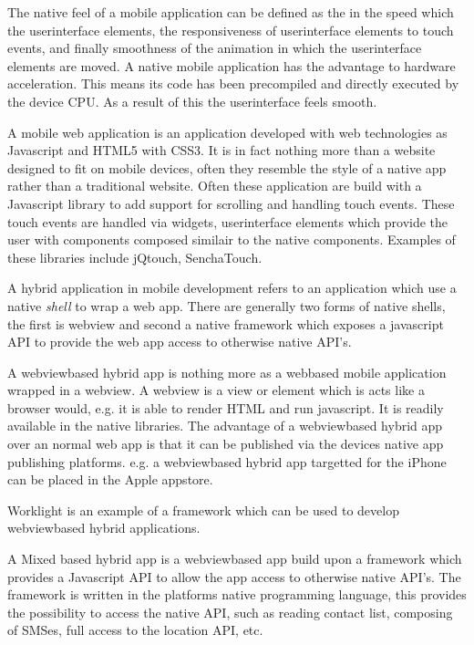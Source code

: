
The native feel of a mobile application can be defined as the in the speed which the userinterface elements, the responsiveness of userinterface elements to touch events, and finally smoothness of the animation in which the userinterface elements are moved.
A native mobile application has the advantage to hardware acceleration. This means its code has been precompiled and directly executed by the device CPU. As a result of this the userinterface feels smooth.
 	

A mobile web application is an application developed with web technologies as Javascript and HTML5 with CSS3. It is in fact nothing more than a website designed to fit on mobile devices, often they resemble the style of a native app rather than a traditional website. Often these application are build with a Javascript library to add support for scrolling and handling touch events. These touch events are handled via widgets, userinterface elements which provide the user with components composed similair to the native components. Examples of these libraries include jQtouch, SenchaTouch.


A hybrid application in mobile development refers to an application which use a native \emph{shell} to wrap a web app. There are generally two forms of native shells,  the first is  webview and second a native framework which exposes a javascript API to provide the web app access to otherwise native API's.

A webviewbased hybrid app is nothing more as a webbased mobile application wrapped in a webview. A webview is a view or element which is acts like a browser would, e.g. it is able to render HTML and run javascript.  It is readily available in the native libraries. The advantage of a webviewbased hybrid app over an normal web app is that it can be published via the devices native app publishing platforms. e.g. a webviewbased hybrid app targetted for the iPhone can be placed in the Apple appstore. 

Worklight is an example of a framework which can be used to develop webviewbased hybrid applications.

A Mixed based hybrid app is a webviewbased app build upon a framework which provides a Javascript API to allow the app access to otherwise native API's. The framework is written in the platforms native programming language, this provides the possibility to access the native API, such as reading contact list, composing of SMSes, full access to the location API, etc.

